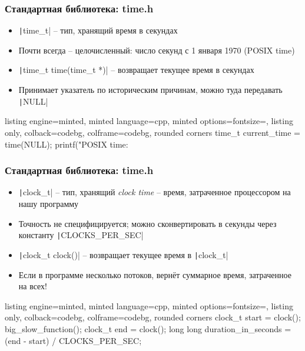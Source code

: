 \documentclass[10pt]{beamer}
\begin{document}
\begin{frame}[fragile]
\frametitle{Стандартная библиотека: time.h}
\begin{itemize}
\item \texttt|time_t| -- тип, хранящий время в секундах
\pause
\item Почти всегда -- целочисленный: число секунд с 1 января 1970 (POSIX time)
\pause
\item \texttt|time_t time(time_t *)| -- возвращает текущее время в секундах
\pause
\item Принимает указатель по историческим причинам, можно туда передавать \texttt|NULL|
\end{itemize}
\pause
{}
\begin{tcblisting}{listing engine=minted, minted language=cpp, minted options={fontsize=\scriptsize}, listing only, colback=codebg, colframe=codebg, rounded corners}
time_t current_time = time(NULL);
printf("POSIX time: %
\end{tcblisting}
\end{frame}

\begin{frame}[fragile]
\frametitle{Стандартная библиотека: time.h}
\begin{itemize}
\item \texttt|clock_t| -- тип, хранящий \textit{clock time} -- время, затраченное процессором на нашу программу
\pause
\item Точность не специфицируется; можно сконвертировать в секунды через константу \texttt|CLOCKS_PER_SEC|
\pause
\item \texttt|clock_t clock()| -- возвращает текущее время в \texttt|clock_t|
\pause
\item Если в программе несколько потоков, вернёт суммарное время, затраченное на всех!
\end{itemize}
\pause
{}
\begin{tcblisting}{listing engine=minted, minted language=cpp, minted options={fontsize=\scriptsize}, listing only, colback=codebg, colframe=codebg, rounded corners}
clock_t start = clock();
big_slow_function();
clock_t end = clock();
long long duration_in_seconds = (end - start) / CLOCKS_PER_SEC;
\end{tcblisting}
\end{frame}
\end{document}
